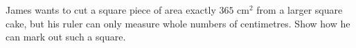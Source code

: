 James wants to cut a square piece of area exactly $365\text{ cm}^2$ from a larger square cake, but his ruler can only measure whole numbers of centimetres. Show how he can mark out such a square.
